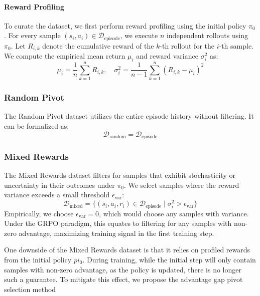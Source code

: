 \paragraph{Reward Profiling}
To curate the dataset, we first perform reward profiling using the initial policy $\pi_0$. For every sample $(s_i, a_i) \in \mathcal{D}_{\text{episode}}$, we execute $n$ independent rollouts using $\pi_0$. Let $R_{i,k}$ denote the cumulative reward of the $k$-th rollout for the $i$-th sample. We compute the empirical mean return $\mu_i$ and reward variance $\sigma^2_i$ as:
\begin{equation}
    \mu_i = \frac{1}{n} \sum_{k=1}^n R_{i,k}, \quad \sigma^2_i = \frac{1}{n-1} \sum_{k=1}^n (R_{i,k} - \mu_i)^2
\end{equation}

\subsubsection{Random Pivot}
The Random Pivot dataset utilizes the entire episode history without filtering. It can be formalized as:
\begin{equation}
    \mathcal{D}_{\text{random}} = \mathcal{D}_{\text{episode}}
\end{equation}

\subsubsection{Mixed Rewards}
The Mixed Rewards dataset filters for samples that exhibit stochasticity or uncertainty in their outcomes under $\pi_0$. We select samples where the reward variance exceeds a small threshold $\epsilon_{\text{var}}$:
\begin{equation}
    \mathcal{D}_{\text{mixed}} = \{ (s_i, a_i, r_i) \in \mathcal{D}_{\text{episode}} \mid \sigma^2_i > \epsilon_{\text{var}} \}
\end{equation}
Empirically, we choose $\epsilon_{\text{var}} = 0$, which would choose any samples with variance. Under the GRPO paradigm, this equates to filtering for any samples with non-zero advantage, maximizing training signal in the first training step.

One downside of the Mixed Rewards dataset is that it relies on profiled rewards from the initial policy $pi_0$. During training, while the initial step will only contain samples with non-zero advantage, as the policy is updated, there is no longer such a guarantee. To mitigate this effect, we propose the advantage gap pivot selection method

